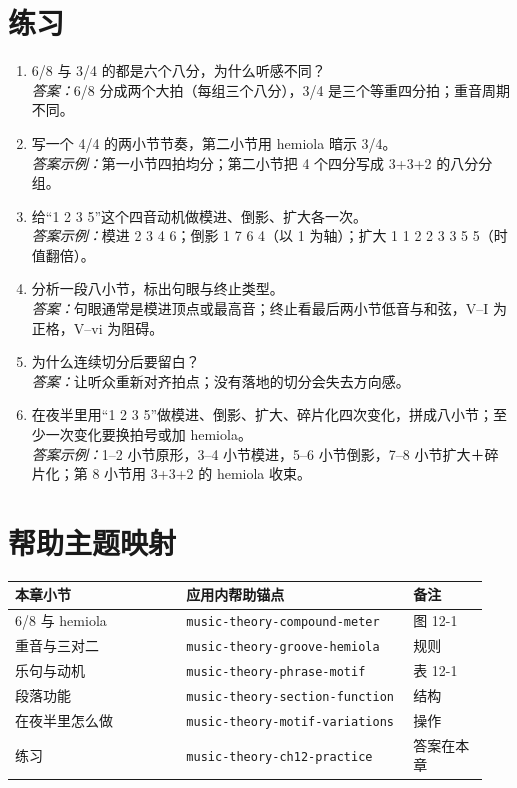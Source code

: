 \section{练习}

\begin{exercise}
\begin{enumerate}
  \item 6/8 与 3/4 的都是六个八分，为什么听感不同？\\
  \emph{答案：}6/8 分成两个大拍（每组三个八分），3/4 是三个等重四分拍；重音周期不同。
  \item 写一个 4/4 的两小节节奏，第二小节用 hemiola 暗示 3/4。\\
  \emph{答案示例：}第一小节四拍均分；第二小节把 4 个四分写成 3+3+2 的八分分组。
  \item 给“1 2 3 5”这个四音动机做模进、倒影、扩大各一次。\\
  \emph{答案示例：}模进 2 3 4 6；倒影 1 7 6 4（以 1 为轴）；扩大 1 1 2 2 3 3 5 5（时值翻倍）。
  \item 分析一段八小节，标出句眼与终止类型。\\
  \emph{答案：}句眼通常是模进顶点或最高音；终止看最后两小节低音与和弦，V--I 为正格，V--vi 为阻碍。
  \item 为什么连续切分后要留白？\\
  \emph{答案：}让听众重新对齐拍点；没有落地的切分会失去方向感。
  \item 在夜半里用“1 2 3 5”做模进、倒影、扩大、碎片化四次变化，拼成八小节；至少一次变化要换拍号或加 hemiola。\\
  \emph{答案示例：}1--2 小节原形，3--4 小节模进，5--6 小节倒影，7--8 小节扩大＋碎片化；第 8 小节用 3+3+2 的 hemiola 收束。
\end{enumerate}
\end{exercise}

\section{帮助主题映射}
\begin{center}
\footnotesize
\setlength{\tabcolsep}{3pt}
\begin{longtable}{p{0.34\linewidth}p{0.45\linewidth}p{0.15\linewidth}}
\toprule
本章小节 & 应用内帮助锚点 & 备注 \\
\midrule
\endhead
6/8 与 hemiola & \texttt{music-theory-compound-meter} & 图 12-1 \\
重音与三对二 & \texttt{music-theory-groove-hemiola} & 规则 \\
乐句与动机 & \texttt{music-theory-phrase-motif} & 表 12-1 \\
段落功能 & \texttt{music-theory-section-function} & 结构 \\
在夜半里怎么做 & \texttt{music-theory-motif-variations} & 操作 \\
练习 & \texttt{music-theory-ch12-practice} & 答案在本章 \\
\bottomrule
\end{longtable}
\end{center}

